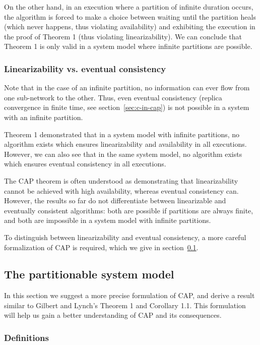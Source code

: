 \documentclass[a4paper,twocolumn,10pt]{article}
\begin{document}
On the other hand, in an execution where a partition of infinite duration occurs, the algorithm is
forced to make a choice between waiting until the partition heals (which never happens, thus
violating availability) and exhibiting the execution in the proof of Theorem 1 (thus violating
linearizability). We can conclude that Theorem 1 is only valid in a system model where infinite
partitions are possible.

\subsubsection{Linearizability vs. eventual consistency}

Note that in the case of an infinite partition, no information can ever flow from one sub-network to
the other. Thus, even eventual consistency (replica convergence in finite time, see
section~\ref{sec:c-in-cap}) is not possible in a system with an infinite partition.

Theorem 1 demonstrated that in a system model with infinite partitions, no algorithm exists which
ensures linearizability and availability in all executions. However, we can also see that in the
same system model, no algorithm exists which ensures eventual consistency in all executions.

The CAP theorem is often understood as demonstrating that linearizability cannot be achieved with
high availability, whereas eventual consistency can. However, the results so far do not
differentiate between linearizable and eventually consistent algorithms: both are possible if
partitions are always finite, and both are impossible in a system model with infinite partitions.

To distinguish between linearizability and eventual consistency, a more careful formalization of CAP
is required, which we give in section~\ref{sec:partitionable-model}.

\subsection{The partitionable system model}\label{sec:partitionable-model}

In this section we suggest a more precise formulation of CAP, and derive a result similar to Gilbert
and Lynch's Theorem 1 and Corollary 1.1. This formulation will help us gain a better understanding
of CAP and its consequences.

\subsubsection{Definitions}
\end{document}

